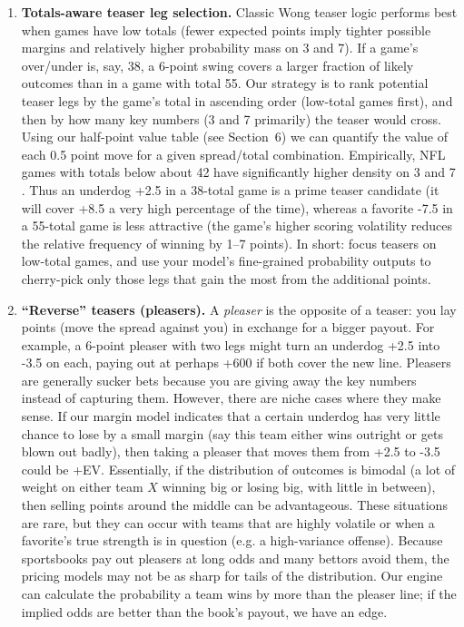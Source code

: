 \documentclass[12pt]{article}
\begin{document}
\begin{enumerate}
    \item \textbf{Totals-aware teaser leg selection.} Classic Wong teaser logic performs best when games have low totals (fewer expected points imply tighter possible margins and relatively higher probability mass on 3 and 7). If a game’s over/under is, say, 38, a 6-point swing covers a larger fraction of likely outcomes than in a game with total 55. Our strategy is to rank potential teaser legs by the game’s total in ascending order (low-total games first), and then by how many key numbers (3 and 7 primarily) the teaser would cross. Using our half-point value table (see Section~6) we can quantify the value of each 0.5 point move for a given spread/total combination. Empirically, NFL games with totals below about 42 have significantly higher density on 3 and 7 \cite{Walsh2024}. Thus an underdog +2.5 in a 38-total game is a prime teaser candidate (it will cover +8.5 a very high percentage of the time), whereas a favorite -7.5 in a 55-total game is less attractive (the game’s higher scoring volatility reduces the relative frequency of winning by 1–7 points). In short: focus teasers on low-total games, and use your model’s fine-grained probability outputs to cherry-pick only those legs that gain the most from the additional points.
    
    \item \textbf{“Reverse” teasers (pleasers).} A \emph{pleaser} is the opposite of a teaser: you lay points (move the spread against you) in exchange for a bigger payout. For example, a 6-point pleaser with two legs might turn an underdog +2.5 into -3.5 on each, paying out at perhaps +600 if both cover the new line. Pleasers are generally sucker bets because you are giving away the key numbers instead of capturing them. However, there are niche cases where they make sense. If our margin model indicates that a certain underdog has very little chance to lose by a small margin (say this team either wins outright or gets blown out badly), then taking a pleaser that moves them from +2.5 to -3.5 could be +EV. Essentially, if the distribution of outcomes is bimodal (a lot of weight on either team $X$ winning big or losing big, with little in between), then selling points around the middle can be advantageous. These situations are rare, but they can occur with teams that are highly volatile or when a favorite’s true strength is in question (e.g. a high-variance offense). Because sportsbooks pay out pleasers at long odds and many bettors avoid them, the pricing models may not be as sharp for tails of the distribution. Our engine can calculate the probability a team wins by more than the pleaser line; if the implied odds are better than the book’s payout, we have an edge.
    

\end{enumerate}
\end{document}
